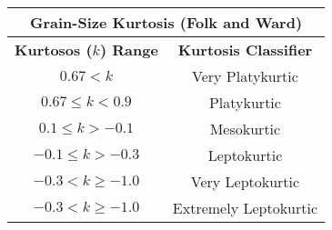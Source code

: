 \documentclass[10pt]{article}
\begin{document}
\begin{center}
\begin{tabular}{ c c  }
\multicolumn{2}{c}{\textbf{Grain-Size Kurtosis (Folk and Ward) }} \\
\hline
\textbf{Kurtosos ($k$) Range} & \textbf{Kurtosis Classifier}  \\
\hline
$ 0.67 < k  $               &  Very Platykurtic   \\ 
$0.67 \le k < 0.9 $    &  Platykurtic   \\  
$0.1 \le k > -0.1 $   &  Mesokurtic  \\     
$-0.1 \le k > -0.3 $    & Leptokurtic    \\   
$-0.3 < k \ge -1.0 $    & Very Leptokurtic  \\
$-0.3 < k \ge -1.0 $    & Extremely Leptokurtic  \\
\end{tabular}
\end{center}
\end{document}
